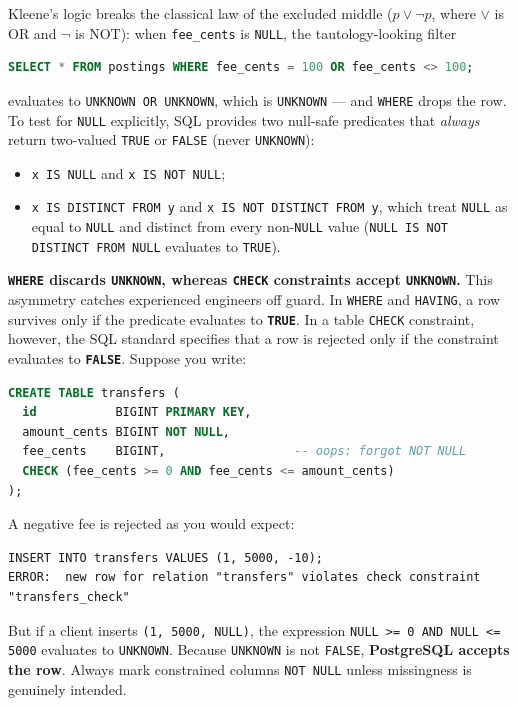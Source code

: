Kleene's logic breaks the classical law of the excluded middle ($p \lor \neg p$, where $\lor$ is OR and $\neg$ is NOT): when \texttt{fee\_cents} is \texttt{NULL}, the tautology-looking filter
\begin{lstlisting}[language=SQL]
SELECT * FROM postings WHERE fee_cents = 100 OR fee_cents <> 100;
\end{lstlisting}
evaluates to \texttt{UNKNOWN OR UNKNOWN}, which is \texttt{UNKNOWN} --- and \texttt{WHERE} drops the row. To test for \texttt{NULL} explicitly, SQL provides two null-safe predicates that \emph{always} return two-valued \texttt{TRUE} or \texttt{FALSE} (never \texttt{UNKNOWN}):
\begin{itemize}
  \item \texttt{x IS NULL} and \texttt{x IS NOT NULL};
  \item \texttt{x IS DISTINCT FROM y} and \texttt{x IS NOT DISTINCT FROM y}, which treat \texttt{NULL} as equal to \texttt{NULL} and distinct from every non-\texttt{NULL} value (\texttt{NULL IS NOT DISTINCT FROM NULL} evaluates to \texttt{TRUE}).
\end{itemize}

\begin{trapbox}
\textbf{\texttt{WHERE} discards \texttt{UNKNOWN}, whereas \texttt{CHECK} constraints accept \texttt{UNKNOWN}.}
This asymmetry catches experienced engineers off guard. In \texttt{WHERE} and \texttt{HAVING}, a row survives only if the predicate evaluates to \textbf{\texttt{TRUE}}. In a table \texttt{CHECK} constraint, however, the SQL standard specifies that a row is rejected only if the constraint evaluates to \textbf{\texttt{FALSE}}. Suppose you write:
\begin{lstlisting}[language=SQL]
CREATE TABLE transfers (
  id           BIGINT PRIMARY KEY,
  amount_cents BIGINT NOT NULL,
  fee_cents    BIGINT,                  -- oops: forgot NOT NULL
  CHECK (fee_cents >= 0 AND fee_cents <= amount_cents)
);
\end{lstlisting}
A negative fee is rejected as you would expect:
\begin{lstlisting}[language=Plain]
INSERT INTO transfers VALUES (1, 5000, -10);
ERROR:  new row for relation "transfers" violates check constraint "transfers_check"
\end{lstlisting}
But if a client inserts \texttt{(1, 5000, NULL)}, the expression \texttt{NULL >= 0 AND NULL <= 5000} evaluates to \texttt{UNKNOWN}. Because \texttt{UNKNOWN} is not \texttt{FALSE}, \textbf{PostgreSQL accepts the row}. Always mark constrained columns \texttt{NOT NULL} unless missingness is genuinely intended.
\end{trapbox}

